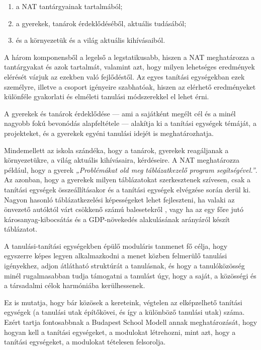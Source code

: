 \begin{enumerate}
\def\labelenumi{\arabic{enumi}.}
\tightlist
\item
  a NAT tantárgyainak tartalmából;
\item
  a gyerekek, tanárok érdeklődéséből, aktuális tudásából;
\item
  és a környezetük és a világ aktuális kihívásaiból.
\end{enumerate}

A három komponensből a legelső a legstatikusabb, hiszen a NAT
meghatározza a tantárgyakat és azok tartalmát, valamint azt, hogy milyen
lehetséges eredmények elérését várjuk az ezekben való fejlődéstől. Az
egyes tanítási egységekban ezek személyre, illetve a csoport igényeire
szabhatóak, hiszen az elérhető eredményeket különféle gyakorlati és
elméleti tanulási módszerekkel el lehet érni.

A gyerekek és tanárok érdeklődése --- ami a sajátként megélt cél és a
minél nagyobb fokú bevonódás alapfeltétele --- alakítja ki a tanítási
egységek témáját, a projekteket, és a gyerekek egyéni tanulási idejét is
meghatározhatja.

Mindemellett az iskola szándéka, hogy a tanárok, gyerekek reagáljanak a
környezetükre, a világ aktuális kihívásaira, kérdéseire. A NAT
meghatározza például, hogy a gyerek \emph{„Problémákat old meg
táblázatkezelő\break
program segítségével.''}. Az azonban, hogy a gyerekek
milyen táblázatokat szerkesztenek szívesen, csak a tanítási egységek
összeállításakor és a tanítási egységek elvégzése során derül ki. Nagyon
hasonló táblázatkezelési képességeket lehet fejleszteni, ha valaki az
önvezető autóktól várt csökkenő számú balesetekről , vagy ha az egy főre
jutó károsanyag-kibocsátás és a GDP-növekedés alakulásának arányáról
készít táblázatot.

A tanulási-tanítási egységekben épülő moduláris tanmenet fő célja, hogy
egyszerre képes legyen alkalmazkodni a menet közben felmerülő tanulási
igényekhez, adjon átlátható struktúrát a tanulásnak, és hogy a
tanulóközösség minél rugalmasabban tudja támogatni a tanulást úgy, hogy
a saját, a közösségi és a társadalmi célok harmóniába kerülhessenek.

Ez is mutatja, hogy bár közösek a kereteink, végtelen az elképzelhető
tanítási egységek (a tanulási utak építőkövei, és így a különböző
tanulási utak) száma. Ezért tartja fontosabbnak a Budapest School Modell
annak meghatározását, hogy hogyan kell a tanítási egységeket, a
modulokat létrehozni, mint azt, hogy a tanítási egységeket, a modulokat
tételesen felsorolja.

